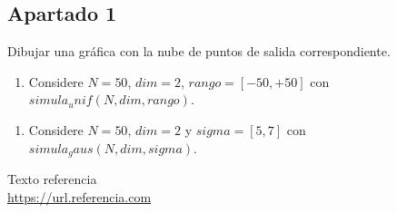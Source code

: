 \documentclass[11pt,a4paper]{article}
\begin{document}
\subsection*{Apartado 1}

Dibujar una gráfica con la nube de puntos de salida correspondiente.

\begin{enumerate}[label=\textit{\alph*})]
	\item Considere $N = 50$, $dim = 2$, $rango = [-50, +50]$ con $simula_unif(N, dim, rango)$.
\end{enumerate}

\begin{enumerate}[resume,label=\textit{\alph*})]
	\item Considere $N = 50$, $dim = 2$ y $sigma = [5, 7]$ con $simula_gaus(N, dim, sigma)$.
\end{enumerate}


\newpage

\begin{thebibliography}{5}

Texto referencia
\\\url{https://url.referencia.com}

\end{thebibliography}
\end{document}
